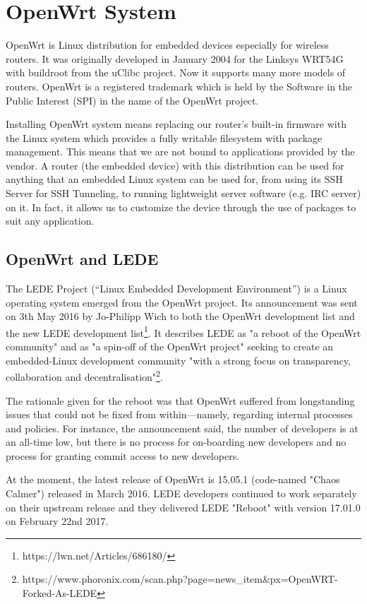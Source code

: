 \section{OpenWrt System}\label{owrt}
OpenWrt is Linux distribution for embedded devices especially for wireless routers.
It was originally developed in January 2004 for the Linksys WRT54G with buildroot from the uClibc project.
Now it supports many more models of routers.
OpenWrt is a registered trademark which is held by the Software in the Public Interest (SPI) in the name of the OpenWrt project.

Installing OpenWrt system means replacing our router’s built-in firmware with the Linux system which provides a fully writable filesystem with package management.
This means that we are not bound to applications provided by the vendor.
A router (the embedded device) with this distribution can be used for anything that an embedded Linux system can be used for, from using its SSH Server for SSH Tunneling, to running lightweight server software (e.g. IRC server) on it.
In fact, it allows us to customize the device through the use of packages to suit any application. \cite{openwrt}



\subsection{OpenWrt and LEDE}\label{LEDE}

The LEDE Project (“Linux Embedded Development Environment”) is a Linux operating system emerged from the OpenWrt project.
Its announcement was sent on 3th May 2016 by Jo-Philipp Wich to both the OpenWrt development list and the new LEDE development list\footnote{https://lwn.net/Articles/686180/}.
It describes LEDE as "a reboot of the OpenWrt community" and as "a spin-off of the OpenWrt project" seeking to create an embedded-Linux development community "with a strong focus on transparency, collaboration and decentralisation"\footnote{https://www.phoronix.com/scan.php?page=news\_item\&px=OpenWRT-Forked-As-LEDE}.

The rationale given for the reboot was that OpenWrt suffered from longstanding issues that could not be fixed from within—namely, regarding internal processes and policies.
For instance, the announcement said, the number of developers is at an all-time low, but there is no process for on-boarding new developers and no process for granting commit access to new developers.

At the moment, the latest release of OpenWrt is 15.05.1 (code-named "Chaos Calmer") released in March 2016.
LEDE developers continued to work separately on their upstream release and they delivered LEDE "Reboot" with version 17.01.0 on February 22nd 2017.


